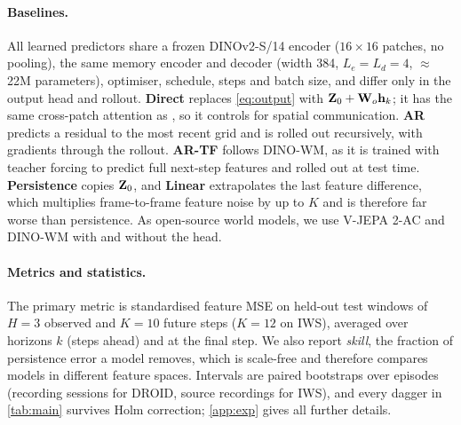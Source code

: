\paragraph{Baselines.} All learned predictors share a frozen DINOv2-S/14 encoder ($16{\times}16$ patches, no pooling),
the same memory encoder and decoder (width 384, $L_e{=}L_d{=}4$, $\approx$22M parameters), optimiser, schedule, steps and
batch size, and differ only in the output head and rollout.
%
\textbf{Direct} replaces \cref{eq:output} with $\mathbf{Z}_0+\mathbf{W}_o\mathbf{h}_k$; it has the same cross-patch attention as
\ours{}, so it controls for spatial communication.
%
\textbf{AR} predicts a residual to the most recent grid and is rolled out recursively, with gradients through the
rollout.
%
\textbf{AR-TF} follows DINO-WM, as it is trained with teacher forcing to predict full next-step features and rolled out at
test time.
%
\textbf{Persistence} copies $\mathbf{Z}_0$, and \textbf{Linear} extrapolates the last feature difference, which multiplies frame-to-frame feature noise by up to $K$ and is therefore
far worse than persistence.
%
As open-source world models, we use V-JEPA 2-AC and DINO-WM with and without the \ours{} head.

\paragraph{Metrics and statistics.} The primary metric is standardised feature MSE on held-out test windows of $H{=}3$
observed and $K{=}10$ future steps ($K{=}12$ on IWS), averaged over horizons $k$ (steps ahead) and at the final step.
%
We also report \emph{skill}, the fraction of persistence error a model removes, which is scale-free and therefore
compares models in different feature spaces.
%
Intervals are paired bootstraps over episodes (recording sessions for DROID, source recordings for IWS), and every
dagger in \cref{tab:main} survives Holm correction; \cref{app:exp} gives all further details.
